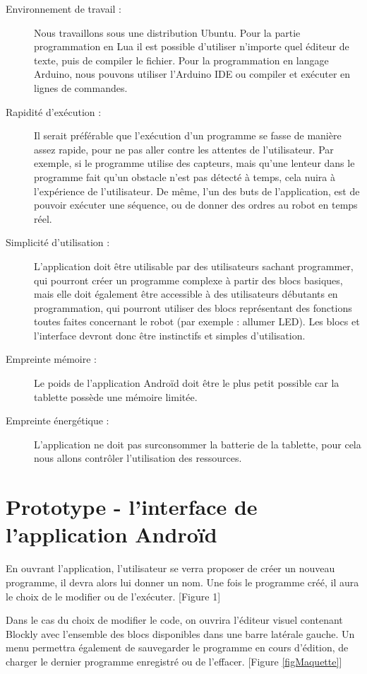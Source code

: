 \documentclass[12pt,francais]{report}
\begin{document}
\begin{description}
	\item [Environnement de travail :]Nous travaillons sous une distribution Ubuntu. Pour la partie programmation en Lua\cite{refLua} il est possible d'utiliser n'importe quel éditeur de texte, puis de compiler le fichier. Pour la programmation en langage Arduino, nous pouvons utiliser l'Arduino IDE ou compiler et exécuter en lignes de commandes.
	\item [Rapidité d'exécution :] Il serait préférable que l'exécution d'un programme se fasse de manière assez rapide, pour ne pas aller contre les attentes de l'utilisateur. Par exemple, si le programme utilise des capteurs, mais qu'une lenteur dans le programme fait qu'un obstacle n'est pas détecté à temps, cela nuira à l'expérience de l'utilisateur. De même, l'un des buts de l'application, est de pouvoir exécuter une séquence, ou de donner des ordres au robot en temps réel. 
	\item [Simplicité d'utilisation : ]L'application doit être utilisable par des utilisateurs sachant programmer, qui pourront créer un programme complexe à partir des blocs basiques, mais elle doit également être accessible à des utilisateurs débutants en programmation, qui pourront utiliser des blocs représentant des fonctions toutes faites concernant le robot (par exemple : allumer LED). Les blocs et l'interface devront donc être instinctifs et simples d'utilisation.
	\item [Empreinte mémoire :] Le poids de l'application Androïd doit être le plus petit possible car la tablette possède une mémoire limitée.
	\item [Empreinte énergétique :] L'application ne doit pas surconsommer la batterie de la tablette, pour cela nous allons contrôler l'utilisation des ressources.
\end{description}

\section*{Prototype - l'interface de l'application Androïd }
En ouvrant l'application, l'utilisateur se verra proposer de créer un nouveau programme, il devra alors lui donner un nom. Une fois le programme créé, il aura le choix de le modifier ou de l'exécuter. [Figure 1]

Dans le cas du choix de modifier le code, on ouvrira l'éditeur visuel contenant Blockly avec l'ensemble des blocs disponibles dans une barre latérale gauche. Un menu permettra également de sauvegarder le programme en cours d'édition, de charger le dernier programme enregistré ou de l'effacer. [Figure \ref{figMaquette}]\\
\end{document}
